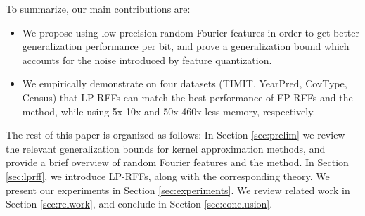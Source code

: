To summarize, our main contributions are:
\begin{itemize}
	\item We propose using low-precision random Fourier features in order to get better generalization performance per bit, and prove a generalization bound which accounts for the noise introduced by feature quantization.
	\item We empirically demonstrate on four datasets (TIMIT, YearPred, CovType, Census) that LP-RFFs can match the best performance of FP-RFFs and the \Nystrom method, while using 5x-10x and 50x-460x less memory, respectively.
\end{itemize}

The rest of this paper is organized as follows: In Section \ref{sec:prelim} we review the relevant generalization bounds for kernel approximation methods, and provide a brief overview of random Fourier features and the \Nystrom method.  In Section \ref{sec:lprff}, we introduce LP-RFFs, along with the corresponding theory. We present our experiments in Section \ref{sec:experiments}.  We review related work in Section \ref{sec:relwork}, and conclude in Section \ref{sec:conclusion}.
